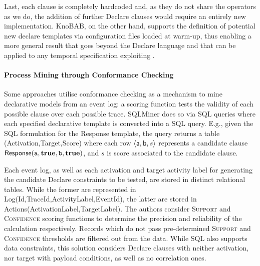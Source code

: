 Last, each clause is completely hardcoded and, as they do not share the operators as we do, the addition of further Declare clauses would require an entirely new implementation. KnoBAB, on the other hand, supports the definition of potential new declare templates via configuration files loaded at warm-up, %
thus enabling a more general result that goes beyond the Declare language and that can be applied to any temporal specification exploiting \LTLf.



\paragraph*{Process Mining through Conformance Checking}
Some approaches utilise conformance checking as a mechanism to mine declarative {models}  from an event log: a scoring function tests %
the validity of each possible clause over each possible trace. %
SQLMiner \cite{SchonigRCJM16} {does so via} SQL queries \cite{Schonig15} {where e}ach specified declarative {template} %
{is} converted into a SQL query. E.g., given the SQL formulation for the \textsf{Response} template, the query returns a table \textsf{(Activation,Target,Score)} where each row $\braket{\textsf{a},\textsf{b},s}$ represents a candidate clause $\textsf{Response}(\texttt{a},\textbf{true},\texttt{b},\textbf{true})$, and $s$ is   score associated to the candidate clause.

Each event log, as well as each activation and target activity label for generating the candidate Declare constraints to be tested, are stored in distinct relational tables. While the former are represented in  \textsf{Log(Id,TraceId,ActivityLabel,EventId)}, the latter are stored in \textsf{Actions(ActivationLabel,TargetLabel)}. The authors consider 
\textsc{Support} and \textsc{Confidence} scoring functions to determine the precision and reliability of the calculation respectively. Records which do not pass pre-determined \textsc{Support} and \textsc{Confidence} thresholds are filtered out from the data. While SQL also supports data constraints, this solution considers Declare clauses with neither activation, nor target %
with payload conditions, as well as no correlation ones.

